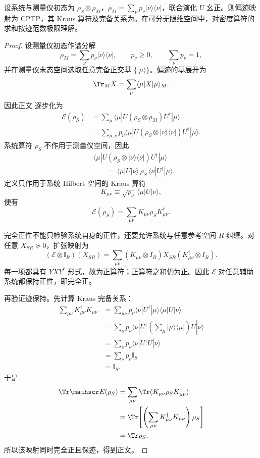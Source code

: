 \begin{theorem}
设系统与测量仪初态为 $\rho_S\otimes\rho_M$，$\rho_M=\sum_\nu p_\nu|\nu\rangle\langle\nu|$，联合演化 $U$ 幺正。则偏迹映射为 CPTP，其 Kraus 算符及完备关系为。在可分无限维空间中，对密度算符的求和按迹范数极限理解。
\end{theorem}
\begin{proof}
设测量仪初态作谱分解
\[
\rho_M=\sum_\nu p_\nu|\nu\rangle\langle\nu|,
\qquad
p_\nu\ge0,
\qquad
\sum_\nu p_\nu=1,
\]
并在测量仪末态空间选取任意完备正交基 $\{|\mu\rangle\}$。偏迹的基展开为
\[
\Tr_M X=\sum_\mu\langle\mu|X|\mu\rangle_M.
\]
因此正文 逐步化为
\begin{align*}
\mathscr E(\rho_S)
&=\sum_\mu
\langle\mu|U(\rho_S\otimes\rho_M)U^\dagger|\mu\rangle\\
&=\sum_{\mu,\nu}p_\nu
\langle\mu|U(\rho_S\otimes|\nu\rangle\langle\nu|)U^\dagger|\mu\rangle.
\end{align*}
系统算符 $\rho_S$ 不作用于测量仪空间，因此
\begin{align*}
&\langle\mu|U(\rho_S\otimes|\nu\rangle\langle\nu|)U^\dagger|\mu\rangle\\
&\qquad=
\langle\mu|U|\nu\rangle\,
\rho_S\,
\langle\nu|U^\dagger|\mu\rangle.
\end{align*}
定义只作用于系统 Hilbert 空间的 Kraus 算符
\[
K_{\mu\nu}
\equiv\sqrt{p_\nu}\,\langle\mu|U|\nu\rangle,
\]
便有
\[
\mathscr E(\rho_S)
=\sum_{\mu\nu}K_{\mu\nu}\rho_SK_{\mu\nu}^\dagger.
\]

完全正性不能只检验系统自身的正性，还要允许系统与任意参考空间 $R$ 纠缠。对任意
$X_{SR}\succeq0$，扩张映射为
\[
(\mathscr E\otimes\mathbb I_R)(X_{SR})
=\sum_{\mu\nu}
(K_{\mu\nu}\otimes I_R)X_{SR}
(K_{\mu\nu}^\dagger\otimes I_R).
\]
每一项都具有 $YXY^\dagger$ 形式，故为正算符；正算符之和仍为正。因此 $\mathscr E$ 对任意辅助系统都保持正性，即完全正。

再验证迹保持。先计算 Kraus 完备关系：
\begin{align*}
\sum_{\mu\nu}K_{\mu\nu}^\dagger K_{\mu\nu}
&=\sum_{\mu\nu}p_\nu
\langle\nu|U^\dagger|\mu\rangle
\langle\mu|U|\nu\rangle\\
&=\sum_\nu p_\nu
\langle\nu|U^\dagger
\left(\sum_\mu|\mu\rangle\langle\mu|\right)
U|\nu\rangle\\
&=\sum_\nu p_\nu\langle\nu|U^\dagger U|\nu\rangle\\
&=\sum_\nu p_\nu \mathbb I_S\\
&=\mathbb I_S.
\end{align*}
于是
\begin{align*}
\Tr\mathscr E(\rho_S)
&=\sum_{\mu\nu}\Tr(K_{\mu\nu}\rho_SK_{\mu\nu}^\dagger)\\
&=\Tr\!\left[\left(\sum_{\mu\nu}K_{\mu\nu}^\dagger K_{\mu\nu}\right)\rho_S\right]\\
&=\Tr\rho_S.
\end{align*}
所以该映射同时完全正且保迹，得到正文。
\end{proof}


